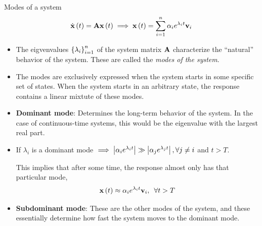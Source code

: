 \documentclass[aspectratio=169]{beamer}
\def\mf{\ensuremath\mathbf}
\def\lp{\ensuremath\left(}
\def\rp{\ensuremath\right)}
\def\lv{\ensuremath\left\lvert}
\def\rv{\ensuremath\right\rvert}
\def\lc{\ensuremath\left\{}
\def\rc{\ensuremath\right\}}
\newcommand{\ct}[1]{\lp #1\rp}
\begin{document}
\begin{frame}{Modes of a system}
\vspace{-0.5cm}
\[ \dot{\mf{x}}\ct{t} = \mf{A}\mf{x}\ct{t} \implies \mf{x}\ct{t} = \sum_{i=1}^n \alpha_ie^{\lambda_it}\mf{v}_i \]
\vspace{-0.5cm}

\begin{itemize}
    \item The eigvenvalues $\lc \lambda_i\rc_{i=1}^n$ of the system matrix $\mf{A}$ characterize the ``natural'' behavior of the system. These are called the \textit{modes of the system}.

    \item The modes are exclusively expressed when the system starts in some specific set of states. When the system starts in an arbitrary state, the  response contains a linear mixtute of these modes.

    \item \textbf{Dominant mode}: Determines the long-term behavior of the system. In the case of continuous-time systems, this would be the eigenvalue with the largest real part.

    \item If $\lambda_i$ is a dominant mode $\implies \lv \alpha_ie^{\lambda_it} \rv \gg \lv \alpha_je^{\lambda_jt} \rv, \forall j \neq i$ and $t > T$.

    This implies that after some time, the response almost only has that particular mode,
    \[ \mf{x}\ct{t} \approx \alpha_ie^{\lambda_i t}\mf{v}_i, \,\,\, \forall t > T \]

    \item \textbf{Subdominant mode}: These are the other modes of the system, and these essentially determine how fast the system moves to the dominant mode.
\end{itemize}
\end{frame}
\end{document}
